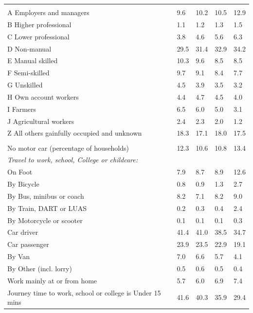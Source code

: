 \documentclass{article}
\begin{document}
\begin{table}[h]
\begin{tabular}{KTTTT}
\hline
    \\ 
    \hline
A Employers and managers &  9.6& 10.2& 10.5& 12.9\\
B Higher professional & 1.1& 1.2& 1.3& 1.5\\
C Lower professional & 3.8& 4.6& 5.6& 6.3\\
D Non-manual & 29.5& 31.4& 32.9& 34.2\\
E Manual skilled & 10.3&  9.6&  8.5&  8.5\\
F Semi-skilled & 9.7& 9.1& 8.4& 7.7\\
G Unskilled & 4.5& 3.9& 3.5& 3.2\\
H Own account workers & 4.4& 4.7& 4.5& 4.0\\
I Farmers & 6.5& 6.0& 5.0& 3.1\\
J Agricultural workers & 2.4& 2.3& 2.0& 1.2\\
Z All others gainfully occupied and unknown & 18.3& 17.1& 18.0& 17.5\\
\hline
{}\hline
    \\ 
    \hline
No motor car (percentage of households) & 12.3& 10.6& 10.8& 
13.4\\
    \hline 
\emph{Travel to work, school, College or childcare:} & & & \\
\quad On Foot &  7.9&  8.7&  8.9& 12.6\\ 
\quad By Bicycle & 0.8& 0.9& 1.3& 2.7\\ 
\quad By Bus, minibus or coach & 8.2& 7.1& 8.2& 9.0\\
\quad By Train, DART or LUAS & 0.2& 0.3& 0.4& 2.4\\
\quad By Motorcycle or scooter & 0.1& 0.1& 0.1& 0.3\\
\quad Car driver & 41.4 & 41.0& 38.5& 34.7\\
\quad Car passenger & 23.9& 23.5& 22.9& 19.1\\
\quad By Van & 7.0& 6.6& 5.7& 4.1\\
\quad By Other (incl. lorry) & 0.5& 0.6& 0.5& 0.4\\
    \hline
Work mainly at or from home & 5.7& 6.0& 6.9& 7.4\\
Journey time to work, school or college is Under 15 mins & 41.6& 40.3& 35.9& 29.4\\

\end{tabular}
\end{table}
\end{document}
